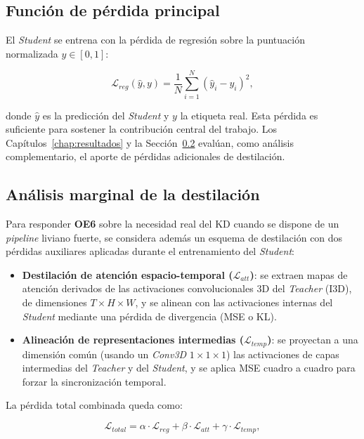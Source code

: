 \subsection{Función de pérdida principal}

El \textit{Student} se entrena con la pérdida de regresión sobre la puntuación normalizada $y \in [0, 1]$:

\[
\mathcal{L}_{reg}(\hat{y}, y) = \frac{1}{N} \sum_{i=1}^{N} (\hat{y}_i - y_i)^2,
\]

donde $\hat{y}$ es la predicción del \textit{Student} y $y$ la etiqueta real. Esta pérdida es suficiente para sostener la contribución central del trabajo. Los Capítulos~\ref{chap:resultados} y la Sección~\ref{sec:kd_marginal} evalúan, como análisis complementario, el aporte de pérdidas adicionales de destilación.

\subsection{Análisis marginal de la destilación}
\label{sec:kd_marginal}

Para responder \textbf{OE6} sobre la necesidad real del \ac{KD} cuando se dispone de un \textit{pipeline} liviano fuerte, se considera además un esquema de destilación con dos pérdidas auxiliares aplicadas durante el entrenamiento del \textit{Student}:

\begin{itemize}
    \item \textbf{Destilación de atención espacio-temporal ($\mathcal{L}_{att}$)}: se extraen mapas de atención derivados de las activaciones convolucionales 3D del \textit{Teacher} (\ac{I3D}), de dimensiones $T \times H \times W$, y se alinean con las activaciones internas del \textit{Student} mediante una pérdida de divergencia (\ac{MSE} o \ac{KL}).
    \item \textbf{Alineación de representaciones intermedias ($\mathcal{L}_{temp}$)}: se proyectan a una dimensión común (usando un \textit{Conv3D} $1\times1\times1$) las activaciones de capas intermedias del \textit{Teacher} y del \textit{Student}, y se aplica \ac{MSE} cuadro a cuadro para forzar la sincronización temporal.
\end{itemize}

La pérdida total combinada queda como:

\[
\mathcal{L}_{total} = \alpha \cdot \mathcal{L}_{reg} + \beta \cdot \mathcal{L}_{att} + \gamma \cdot \mathcal{L}_{temp},
\]

